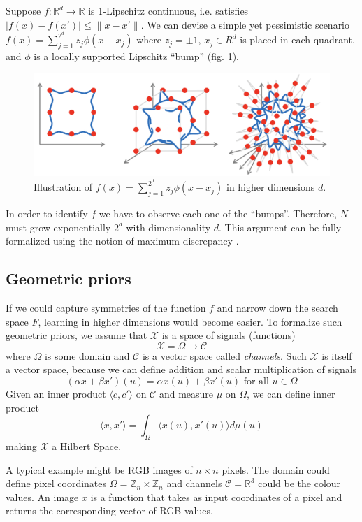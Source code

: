 \documentclass[oneside,english,logo]{amuthesis}
\begin{document}
Suppose $f: \mathbb{R}^d\rightarrow\mathbb{R}$ is 1-Lipschitz continuous, i.e. satisfies $\vert f(x)-f(x')\vert \le \lVert x-x'\rVert$. We can devise a simple yet pessimistic scenario $f(x)=\sum_{j=1}^{2^d} z_j \phi(x-x_j)$ where $z_j=\pm 1$, $x_j\in R^d$ is placed in each quadrant, and $\phi$ is a locally supported Lipschitz ``bump'' (fig. \ref{fig:curse_of_dim}).
\begin{figure}[!htbp]
	\centering
	\includegraphics[width=13cm]{curse_of_dim }
	\caption{Illustration of $f(x)=\sum_{j=1}^{2^d} z_j \phi(x-x_j)$ in higher dimensions $d$.}
	\label{fig:curse_of_dim}
\end{figure}
In order to identify $f$ we have to observe each one of the ``bumps''. Therefore, $N$ must grow exponentially $2^d$ with dimensionality $d$. This argument can be fully formalized using the notion of maximum discrepancy \cite{lipschitz}.

\subsection{Geometric priors}

If we could capture symmetries of the function $f$ and narrow down the search space $F$, learning in higher dimensions would become easier. To formalize such geometric priors, we assume that $\mathcal{X}$ is a space of signals (functions)
\[
\mathcal{X} = \Omega \rightarrow \mathcal{C}
\]
where $\Omega$ is some domain and $\mathcal{C}$ is a vector space called \textit{channels}. Such $\mathcal{X}$ is itself a vector space, because we can define addition and scalar multiplication of signals
\[
(\alpha x + \beta x')(u) = \alpha x(u) + \beta x'(u) \text{ for all }u \in \Omega
\]
Given an inner product $\langle c,c' \rangle$ on $\mathcal{C}$ and measure $\mu$ on $\Omega$, we can define inner product
\[
\langle x,x' \rangle = \int_{\Omega} \langle x(u),x'(u) \rangle d \mu(u)
\]
making $\mathcal{X}$ a Hilbert Space.

A typical example might be RGB images of $n\times n$ pixels. The domain could define pixel coordinates $\Omega = \mathbb{Z}_n \times \mathbb{Z}_n$ and channels $\mathcal{C}=\mathbb{R}^3$ could be the colour values. An image $x$ is a function that takes as input coordinates of a pixel and returns the corresponding vector of RGB values.
\end{document}
